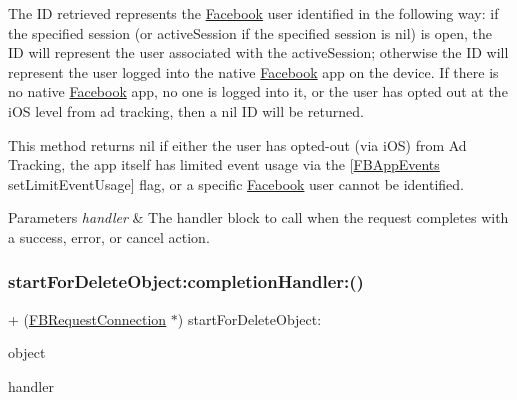 The ID retrieved represents the \hyperlink{interfaceFacebook}{Facebook} user identified in the following way\+: if the specified session (or active\+Session if the specified session is {\ttfamily nil}) is open, the ID will represent the user associated with the active\+Session; otherwise the ID will represent the user logged into the native \hyperlink{interfaceFacebook}{Facebook} app on the device. If there is no native \hyperlink{interfaceFacebook}{Facebook} app, no one is logged into it, or the user has opted out at the i\+OS level from ad tracking, then a {\ttfamily nil} ID will be returned.

This method returns {\ttfamily nil} if either the user has opted-\/out (via i\+OS) from Ad Tracking, the app itself has limited event usage via the {\ttfamily \mbox{[}\hyperlink{interfaceFBAppEvents}{F\+B\+App\+Events} set\+Limit\+Event\+Usage\mbox{]}} flag, or a specific \hyperlink{interfaceFacebook}{Facebook} user cannot be identified.


\begin{DoxyParams}{Parameters}
{\em handler} & The handler block to call when the request completes with a success, error, or cancel action. \\
\hline
\end{DoxyParams}
\mbox{\label{interfaceFBRequestConnection_a3fc3ae420d8e47fd0b7a6b915622c527}} 
\subsubsection{\texorpdfstring{start\+For\+Delete\+Object\+:completion\+Handler\+:()}{startForDeleteObject:completionHandler:()}\hspace{0.1cm}{\footnotesize\ttfamily [1/5]}}
{\footnotesize\ttfamily + (\hyperlink{interfaceFBRequestConnection}{F\+B\+Request\+Connection} $\ast$) start\+For\+Delete\+Object\+: \begin{DoxyParamCaption}\item[{(id)}]{object }\item[{completionHandler:(F\+B\+Request\+Handler)}]{handler }\end{DoxyParamCaption}}


